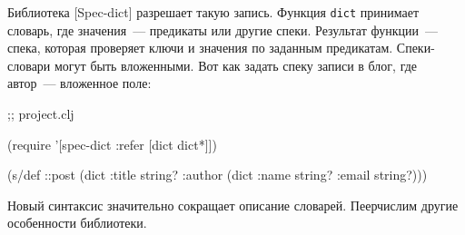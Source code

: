 Библиотека [Spec-dict]
разрешает такую запись. Функция \verb|dict| принимает словарь, где значения~--- предикаты
или другие спеки. Результат функции~--- спека, которая проверяет ключи и значения
по заданным предикатам. Спеки-словари могут быть вложенными. Вот как задать
спеку записи в блог, где автор~--- вложенное поле:

\begin{english}
  \begin{clojure}
 ;; project.clj

(require '[spec-dict :refer [dict dict*]])

(s/def ::post
  (dict {:title string?
         :author (dict {:name string?
                        :email string?})}))
  \end{clojure}
\end{english}

Новый синтаксис значительно сокращает описание словарей. Пеерчислим другие
особенности библиотеки.

